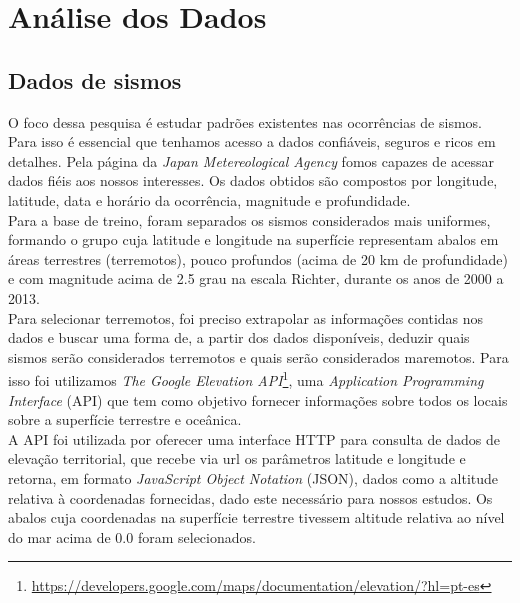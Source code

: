 \chapter{Análise dos Dados}\label{chapter5}
\section{Dados de sismos}
O foco dessa pesquisa é estudar padrões existentes nas ocorrências de sismos. Para isso é essencial que tenhamos acesso a dados confiáveis, seguros e ricos em detalhes. Pela página da {\it Japan Metereological Agency} fomos capazes de acessar dados fiéis aos nossos interesses. Os dados obtidos são compostos por longitude, latitude, data e horário da ocorrência, magnitude e profundidade. \\

Para a base de treino, foram separados os sismos considerados mais uniformes, formando o grupo cuja latitude e longitude na superfície representam abalos em áreas terrestres (terremotos), pouco profundos (acima de 20 km de profundidade) e com magnitude acima de 2.5 grau na escala Richter, durante os anos de 2000 a 2013.\\

Para selecionar terremotos, foi preciso extrapolar as informações contidas nos dados e buscar uma forma de, a partir dos dados disponíveis, deduzir quais sismos serão considerados terremotos e quais serão considerados maremotos. Para isso foi utilizamos {\it The Google Elevation API}\footnote[3]{\url {https://developers.google.com/maps/documentation/elevation/?hl=pt-es}}, uma {\it Application Programming Interface} (API) que tem como objetivo fornecer informações sobre todos os locais sobre a superfície terrestre e oceânica. \\

A API foi utilizada por oferecer uma interface HTTP para consulta de dados de elevação territorial, que recebe via url os parâmetros latitude e longitude e retorna, em formato {\it JavaScript Object Notation} (JSON), dados como a altitude relativa à coordenadas fornecidas, dado este necessário para nossos estudos. Os abalos cuja coordenadas na superfície terrestre tivessem altitude relativa ao nível do mar acima de 0.0 foram selecionados.\\

